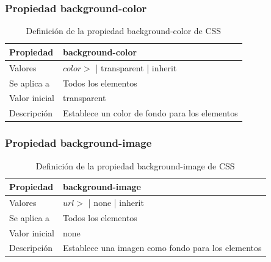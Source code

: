 \begin{frame}
\frametitle{Propiedad background-color}

\begin{center}
  \begin{table}
   \begin{tabular}{p{1.8cm}p{7.8cm}}
Propiedad & \bf{background-color} \\ \hline
Valores& $color>$ | transparent | inherit \\ \hline
Se aplica a& Todos los elementos \\ \hline
Valor inicial& transparent \\ \hline
Descripción& Establece un color de fondo para los elementos \\ \hline
  \end{tabular}
   \caption{Definición de la propiedad background-color de CSS}
 \end{table}
\end{center}


\end{frame}



\begin{frame}
\frametitle{Propiedad background-image}

\begin{center}
  \begin{table}
   \begin{tabular}{p{1.8cm}p{7.8cm}}
Propiedad & \bf{background-image} \\ \hline
Valores& $url>$ | none | inherit \\ \hline
Se aplica a& Todos los elementos \\ \hline
Valor inicial& none \\ \hline
Descripción& Establece una imagen como fondo para los elementos \\ \hline
  \end{tabular}
   \caption{Definición de la propiedad background-image de CSS}
 \end{table}
\end{center}


\end{frame}



